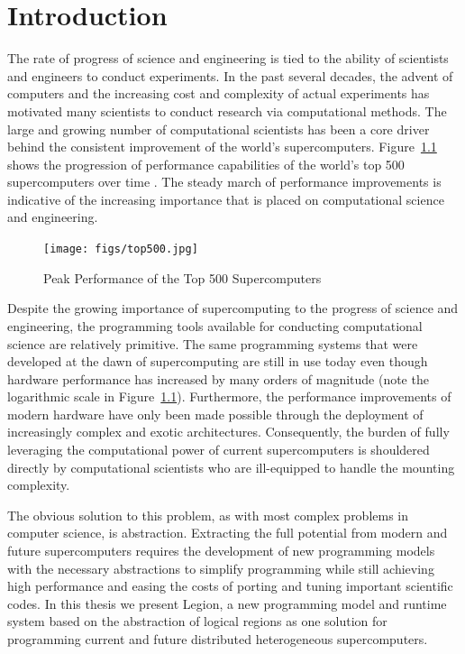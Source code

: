 

\chapter{Introduction}
\label{chapter:intro}

The rate of progress of science and
engineering is tied to the ability of scientists and
engineers to conduct experiments. In the past several decades,
the advent of computers and the increasing cost and complexity of 
actual experiments has motivated many scientists to conduct 
research via computational methods. The large and growing 
number of computational scientists has been a core driver 
behind the consistent improvement of the world's supercomputers. 
Figure~\ref{fig:supergrowth} shows the progression of 
performance capabilities of the world's top 500 supercomputers 
over time \cite{Top500}. The steady march of performance 
improvements is indicative of the increasing importance 
that is placed on computational science and engineering. 

\begin{figure}[ht]
\centering
\texttt{[image: figs/top500.jpg]}
\caption{Peak Performance of the Top 500 Supercomputers\cite{Top500}\label{fig:supergrowth}}
\end{figure}

Despite the growing importance of supercomputing to the
progress of science and engineering, the programming tools available
for conducting computational science are relatively primitive.
The same programming systems that were developed at 
the dawn of supercomputing are still in use today even
though hardware performance has increased by many orders
of magnitude (note the logarithmic scale in 
Figure~\ref{fig:supergrowth}). Furthermore, the performance
improvements of modern hardware have only been made
possible through the deployment of increasingly
complex and exotic architectures.
Consequently, the burden of fully leveraging the 
computational power of current supercomputers is
shouldered directly by computational scientists who are 
ill-equipped to handle the mounting complexity.

The obvious solution to this problem, as with most
complex problems in computer science, is abstraction.
Extracting the full potential from modern and future
supercomputers requires the development of new programming
models with the necessary abstractions to simplify programming 
while still achieving high performance and easing the 
costs of porting and tuning important scientific codes. 
In this thesis we present Legion, a new programming model 
and runtime system based on the abstraction of logical regions
as one solution for programming current and future distributed
heterogeneous supercomputers. 

